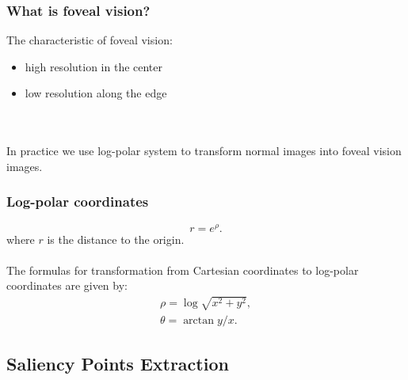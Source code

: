 \documentclass{beamer}
\begin{document}
\begin{frame}
\frametitle{What is foveal vision?}
The characteristic of foveal vision:
\begin{itemize}
\item high resolution in the center
\item low resolution along the edge
\end{itemize}

\\~\\
In practice we use log-polar system to transform normal images into foveal vision images.
\end{frame}

\begin{frame}
\frametitle{Log-polar coordinates}

\begin{equation}
 r = e^\rho .
 \end{equation}
where  $r$  is the distance to the origin. 
\\~\\
The formulas for transformation from Cartesian coordinates to log-polar coordinates are given by:
\begin{equation}
\begin{split} 
\rho = \log\sqrt{ x^2 + y^2}, \\ 
\theta = \arctan y/x.
\end{split}
\end{equation}
\end{frame}




\subsection{Saliency Points Extraction}
\end{document}
